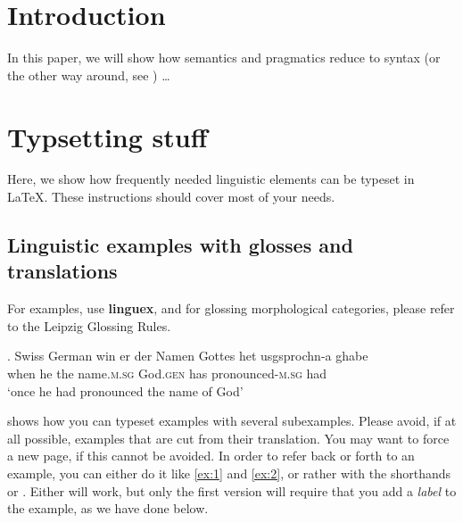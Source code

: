 



\section{Introduction}\label{sec:1}

In this paper, we will show how semantics and pragmatics reduce to
syntax (or the other way around, see \citealt{Kamp:1973,Searle:1964}) \ldots 

\section{Typsetting stuff}

Here, we show how frequently needed linguistic elements can be typeset in \LaTeX. These instructions should cover most of your needs. 

\subsection{Linguistic examples with glosses and translations}

For examples, use \textbf{linguex}, and for glossing morphological categories, please refer to the Leipzig Glossing Rules.

\ex. Swiss German \citep[][346]{hodler69}
\gll win er der Namen Gottes het usgsprochn-a ghabe\\
when he the name.\textsc{m.sg} God.\textsc{gen} has pronounced-\textsc{m.sg} had\\
`once he had pronounced the name of God'

\Next shows how you can typeset examples with several subexamples. Please avoid, if at all possible, examples that are cut from their translation. You may want to force a new page, if this cannot be avoided. In order to refer back or forth to an example, you can either do it like \ref{ex:1} and \ref{ex:2}, or rather with the shorthands \Next[c] or \Last. Either will work, but only the first version will require that you add a \emph{label} to the example, as we have done below.


